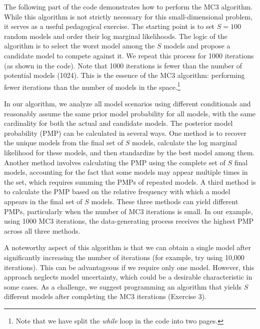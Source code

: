 The following part of the code demonstrates how to perform the MC3 algorithm. While this algorithm is not strictly necessary for this small-dimensional problem, it serves as a useful pedagogical exercise. The starting point is to set $S=100$ random models and order their log marginal likelihoods. The logic of the algorithm is to select the worst model among the $S$ models and propose a candidate model to compete against it. We repeat this process for 1000 iterations (as shown in the code). Note that 1000 iterations is fewer than the number of potential models (1024). This is the essence of the MC3 algorithm: performing fewer iterations than the number of models in the space.\footnote{Note that we have split the \textit{while} loop in the code into two pages.}

In our algorithm, we analyze all model scenarios using different conditionals and reasonably assume the same prior model probability for all models, with the same cardinality for both the actual and candidate models. The posterior model probability (PMP) can be calculated in several ways. One method is to recover the unique models from the final set of $S$ models, calculate the log marginal likelihood for these models, and then standardize by the best model among them. Another method involves calculating the PMP using the complete set of $S$ final models, accounting for the fact that some models may appear multiple times in the set, which requires summing the PMPs of repeated models. A third method is to calculate the PMP based on the relative frequency with which a model appears in the final set of $S$ models. These three methods can yield different PMPs, particularly when the number of MC3 iterations is small. In our example, using 1000 MC3 iterations, the data-generating process receives the highest PMP across all three methods.

A noteworthy aspect of this algorithm is that we can obtain a single model after significantly increasing the number of iterations (for example, try using 10,000 iterations). This can be advantageous if we require only one model. However, this approach neglects model uncertainty, which could be a desirable characteristic in some cases. As a challenge, we suggest programming an algorithm that yields $S$ different models after completing the MC3 iterations (Exercise 3).

